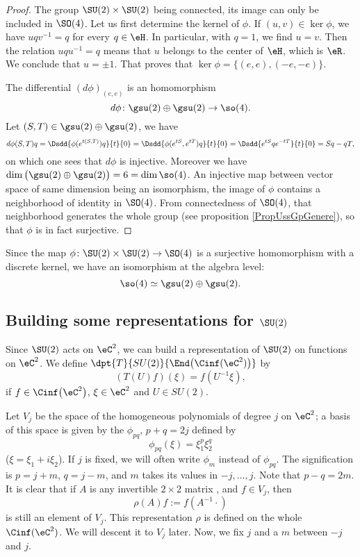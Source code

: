 \begin{proof}
The group $\SU(2)\times \SU(2)$ being connected, its image can only be included in $\SO(4)$. Let us first determine the kernel of $\phi$. If $(u,v)\in\ker\phi$, we have $uqv^{-1}=q$ for every $q\in\eH$. In particular, with $q=1$, we find $u=v$. Then the relation $uqu^{-1}=q$ means that $u$ belongs to the center of $\eH$, which is $\eR$. We conclude that $u=\pm 1$. That proves that $\ker\phi=\big\{  (e,e),(-e,-e) \big\}$.

The differential $(d\phi)_{(e,e)}$ is an homomorphism
\[ 
	d\phi\colon \gsu(2)\oplus\gsu(2)\to \so(4).
\]
Let $(S,T)\in\gsu(2)\oplus\gsu(2)$, we have
\[ 
	d\phi(S,T)q=\Dsdd{ \phi( e^{t(S,T)})q }{t}{0}=\Dsdd{ \phi( e^{tS}, e^{tT})q }{t}{0}=\Dsdd{  e^{tS}q e^{-tT} }{t}{0}=Sq-qT,
\]
on which one sees that $d\phi$ is injective. Moreover we have $\dim\big( \gsu(2)\oplus\gsu(2) \big)=6=\dim\so(4)$. An injective map between vector space of same dimension being an isomorphism, the image of $\phi$ contains a neighborhood of identity in $\SO(4)$. From connectedness of $\SO(4)$, that neighborhood generates the whole group (see proposition \ref{PropUssGpGenere}), so that $\phi$ is in fact surjective.
\end{proof}

Since the map $\phi\colon \SU(2)\times \SU(2)\to \SO(4)$ is a surjective homomorphism with a discrete kernel, we have an isomorphism at the algebra level:
\[ 
	\so(4)\simeq \gsu(2)\oplus\gsu(2).
\]

\subsection{Building some representations for \texorpdfstring{$\SU(2)$}{SU2}}

Since $\SU(2)$ acts on $\eC^2$, we can build a representation of $\SU(2)$ on functions on $\eC^2$. We define $\dpt{T}{SU(2)}{\End\big(\Cinf(\eC^2)\big)}$ by 
\[
  (T(U)f)(\xi)=f(U^{-1}\xi),
\]
if $f\in\Cinf\big(\eC^2\big)$, $\xi\in\eC^2$ and $U\in SU(2)$. 

Let $V_j$ be the space of the homogeneous polynomials of degree $j$ on $\eC^2$; a basis of this space is given by the $\phi_{pq}$, $p+q=2j$ defined by
\begin{equation}
   \phi_{pq}(\xi)=\xi_1^p\xi_2^q
\end{equation}
($\xi=\xi_1+i\xi_2$). If $j$ is fixed, we will often write $\phi_m$ instead of $\phi_{pq}$. The signification is $p=j+m$, $q=j-m$, and $m$ takes its values in $-j,\ldots,j$. Note that $p-q=2m$. It is clear that if $A$ is any invertible $2\times 2$ matrix , and $f\in V_j$, then 
\[
   \rho(A)f:=f(A^{-1} \cdot)
\]
 is still an element of $V_j$. This representation $\rho$ is defined on the whole $\Cinf(\eC^2)$. We will descent it to $V_j$ later.
Now, we fix $j$ and a $m$ between $-j$ and $j$. 

